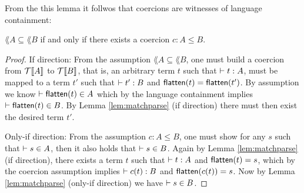 From the this lemma it follwos that coercions are witnesses of language containment:
\begin{lemma}
\label{lem:coerceequiv}
$\lang{A} \subseteq \lang{B}$ if and only if there exists a coercion $c : A \leq B$.
\end{lemma}
\begin{proof}
If direction: From the assumption $\lang{A} \subseteq \lang{B}$, one
must build a coercion from $\mathcal{T}\llbracket A \rrbracket$ to $\mathcal{T}\llbracket B \rrbracket$, that is, an
arbitrary term $t$ such that $\vdash t : A$, must be mapped to a term
$t'$ such that $\vdash t' : B$ and $\mathsf{flatten}(t)=\mathsf{flatten}(t')$. 
By assumption we know $\vdash \mathsf{flatten}(t) \in A$ which by the language
containment implies $\vdash \mathsf{flatten}(t) \in B$. By Lemma
\ref{lem:matchparse} (if direction) there must then exist the desired
term $t'$.

Only-if direction: From the assumption $c : A \leq B$, one must show
for any $s$ such that $\vdash s \in A$, then it also holds that
$\vdash s \in B$. Again by Lemma \ref{lem:matchparse} (if direction),
there exists a term $t$ such that $\vdash t : A$ and
$\mathsf{flatten}(t)=s$, which by the coercion assumption implies
$\vdash c(t) : B$ and $\mathsf{flatten}(c(t))=s$. Now by Lemma
\ref{lem:matchparse} (only-if direction) we have $\vdash s \in B$.


\end{proof}

